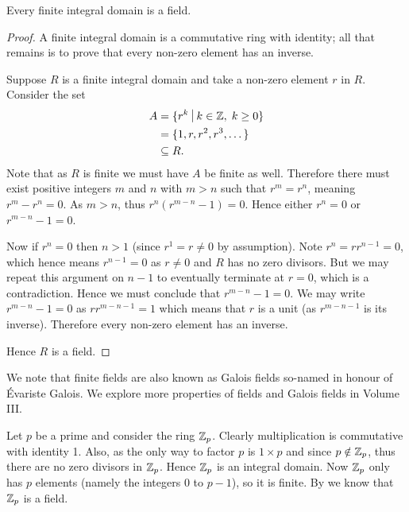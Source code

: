 \begin{theorem}\label{thrm-finite-integral-domain-is-field}
    Every finite integral domain is a field.
\end{theorem}
\begin{proof}
    A finite integral domain is a commutative ring with identity; all that remains is to prove that every non-zero element has an inverse.

    Suppose $R$ is a finite integral domain and take a non-zero element $r$ in $R$. Consider the set
    \begin{align*}
        A &= \{r^k \vert k \in \Z,\;k\geq 0\}\\
        &= \{1, r, r^2, r^3, \dots\}\\
        &\subseteq R.
    \end{align*}
    Note that as $R$ is finite we must have $A$ be finite as well. Therefore there must exist positive integers $m$ and $n$ with $m > n$ such that $r^m = r^n$, meaning $r^m - r^n = 0$. As $m > n$, thus $r^n\left(r^{m-n}-1\right) = 0$. Hence either $r^n = 0$ or $r^{m-n} - 1 = 0$.

    Now if $r^n = 0$ then $n > 1$ (since $r^1 = r \neq 0$ by assumption). Note $r^n = rr^{n-1} = 0$, which hence means $r^{n-1} = 0$ as $r \neq 0$ and $R$ has no zero divisors. But we may repeat this argument on $n - 1$ to eventually terminate at $r = 0$, which is a contradiction. Hence we must conclude that $r^{m-n} - 1 = 0$. We may write $r^{m-n}-1 = 0$ as $rr^{m-n-1} = 1$ which means that $r$ is a unit (as $r^{m-n-1}$ is its inverse). Therefore every non-zero element has an inverse.

    Hence $R$ is a field.
\end{proof}

\begin{remark}
    We note that finite fields are also known as Galois fields so-named in honour of \'{E}variste Galois. We explore more properties of fields and Galois fields in Volume III.
\end{remark}

\begin{example}
    Let $p$ be a prime and consider the ring $\mathbb{Z}_{p}$. Clearly multiplication is commutative with identity 1. Also, as the only way to factor $p$ is $1 \times p$ and since $p \notin \mathbb{Z}_{p}$, thus there are no zero divisors in $\mathbb{Z}_{p}$. Hence $\mathbb{Z}_{p}$ is an integral domain. Now $\mathbb{Z}_{p}$ only has $p$ elements (namely the integers 0 to $p - 1$), so it is finite. By  we know that $\mathbb{Z}_{p}$ is a field.
\end{example}

